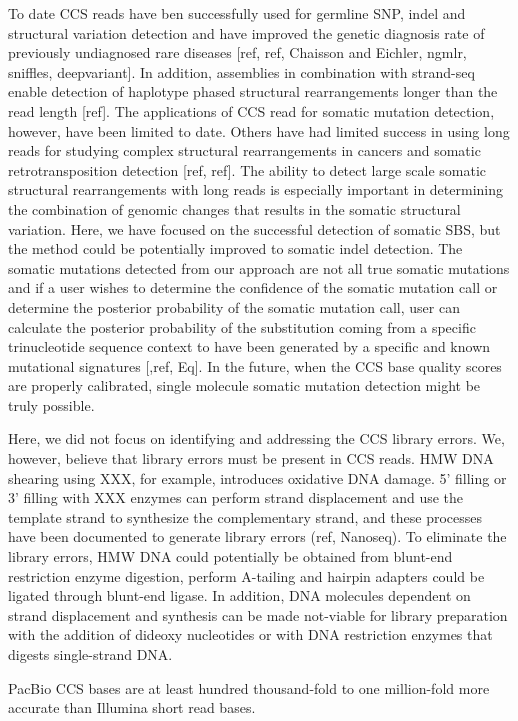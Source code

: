 To date CCS reads have ben successfully used for germline SNP, indel and structural variation detection and have improved the genetic diagnosis rate of previously undiagnosed rare diseases [ref, ref, Chaisson and Eichler, ngmlr, sniffles, deepvariant]. In addition, assemblies in combination with strand-seq enable detection of haplotype phased structural rearrangements longer than the read length [ref]. The applications of CCS read for somatic mutation detection, however, have been limited to date. Others have had limited success in using long reads for studying complex structural rearrangements in cancers and somatic retrotransposition detection [ref, ref]. The ability to detect large scale somatic structural rearrangements with long reads is especially important in determining the combination of genomic changes that results in the somatic structural variation. Here, we have focused on the successful detection of somatic SBS, but the method could be potentially improved to somatic indel detection. The somatic mutations detected from our approach are not all true somatic mutations and if a user wishes to determine the confidence of the somatic mutation call or determine the posterior probability of the somatic mutation call, user can calculate the posterior probability of the substitution coming from a specific trinucleotide sequence context to have been generated by a specific and known mutational signatures [,ref, Eq]. In the future, when the CCS base quality scores are properly calibrated, single molecule somatic mutation detection might be truly possible.

Here, we did not focus on identifying and addressing the CCS library errors. We, however, believe that library errors must be present in CCS reads. HMW DNA shearing using XXX, for example, introduces oxidative DNA damage. 5’ filling or 3’ filling with XXX enzymes can perform strand displacement and use the template strand to synthesize the complementary strand, and these processes have been documented to generate library errors (ref, Nanoseq). To eliminate the library errors, HMW DNA could potentially be obtained from blunt-end restriction enzyme digestion, perform A-tailing and hairpin adapters could be ligated through blunt-end ligase. In addition, DNA molecules dependent on strand displacement and synthesis can be made not-viable for library preparation with the addition of dideoxy nucleotides or with DNA restriction enzymes that digests single-strand DNA. 

PacBio CCS bases are at least hundred thousand-fold to one million-fold more accurate than Illumina short read bases. 

